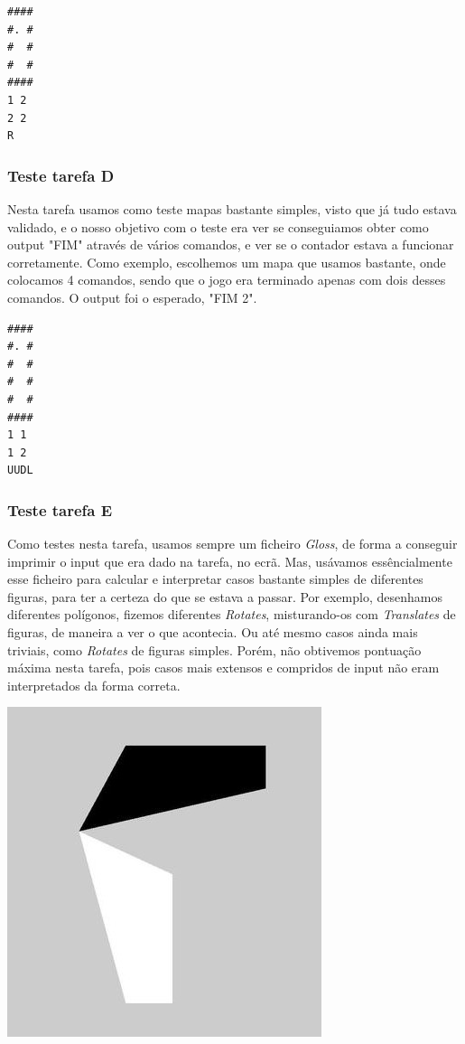 \documentclass[a4paper]{article}
\begin{document}
\begin{Verbatim}
#### 
#. #
#  #
#  #
####
1 2
2 2
R
\end{Verbatim}

\subsubsection{Teste tarefa D}

Nesta tarefa usamos como teste mapas bastante simples, visto que já tudo estava validado, e o nosso objetivo com o teste era ver se conseguiamos obter como output "FIM" através de vários comandos, e ver se o contador estava a funcionar corretamente. Como exemplo, escolhemos um mapa que usamos bastante, onde colocamos 4 comandos, sendo que o jogo era terminado apenas com dois desses comandos. O output foi o esperado, "FIM 2".

\begin{Verbatim}
####
#. #
#  #
#  #
#  #
####
1 1
1 2
UUDL
\end{Verbatim}


\subsubsection{Teste tarefa E}

Como testes nesta tarefa, usamos sempre um ficheiro \textit{Gloss}, de forma a conseguir imprimir o input que era dado na tarefa, no ecrã. Mas, usávamos essêncialmente esse ficheiro para calcular e interpretar casos bastante simples de diferentes figuras, para ter a certeza do que se estava a passar. Por exemplo, desenhamos diferentes polígonos, fizemos diferentes \textit{Rotates}, misturando-os com \textit{Translates} de figuras, de maneira a ver o que acontecia. Ou até mesmo casos ainda mais triviais, como \textit{Rotates} de figuras simples. Porém, não obtivemos pontuação máxima nesta tarefa, pois casos mais extensos e compridos de input não eram interpretados da forma correta.




\begin{center}
\includegraphics[scale=0.35]{3}
\end{center}
\end{document}
